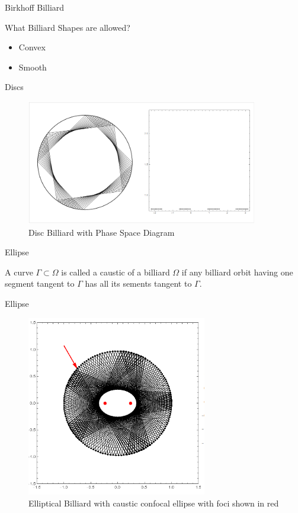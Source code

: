 \documentclass{beamer}
\begin{document}
\begin{frame}{Birkhoff Billiard}
  \begin{block}{What Billiard Shapes are allowed?}
  \begin{itemize}
  \item {
    Convex
  } \pause{}
  \item {
    Smooth
  }
  \end{itemize}
  \end{block}
\end{frame}

\begin{frame}{Discs}
  \begin{figure}
    \centering
    \includegraphics[width = 0.9\textwidth]{CirclePhaseSpace}
    \caption{Disc Billiard with Phase Space Diagram}
  \end{figure}
\end{frame}

\begin{frame}{Ellipse}
\begin{definition}
A curve $\Gamma \subset \Omega$ is called a \alert{caustic} of a billiard $ \Omega$ if any billiard orbit having one segment tangent to $\Gamma$ has all its sements tangent to $\Gamma$. 
\end{definition}
\end{frame}

\begin{frame}{Ellipse}
  \begin{figure}
    \centering
    \includegraphics[width = 0.7\textwidth]{ConfocalEllipse}
    \caption{Elliptical Billiard with caustic confocal ellipse with foci shown in red}
  \end{figure}
\end{frame}
\end{document}
